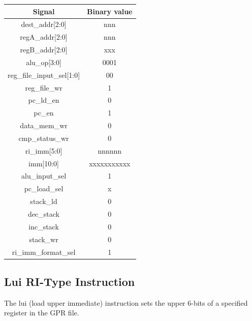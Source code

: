 \documentclass{article}
\begin{document}
\begin{par}
	\begin{center}
		\begin{tabular}{|c|c|}
			\hline 
			\textbf{Signal} & \textbf{Binary value} \\ 
			\hline 
			dest\_addr[2:0] & nnn \\ 
			\hline 
			regA\_addr[2:0] & nnn \\ 
			\hline 
			regB\_addr[2:0] & xxx \\ 
			\hline 
			alu\_op[3:0] & 0001 \\ 
			\hline 
			reg\_file\_input\_sel[1:0] & 00 \\ 
			\hline 
			reg\_file\_wr & 1 \\ 
			\hline 
			pc\_ld\_en & 0 \\ 
			\hline 
			pc\_en & 1 \\ 
			\hline 
			data\_mem\_wr & 0 \\ 
			\hline 
			cmp\_status\_wr & 0 \\ 
			\hline 
			ri\_imm[5:0] & nnnnnn \\ 
			\hline 
			imm[10:0] & xxxxxxxxxxx \\ 
			\hline 
			alu\_input\_sel & 1 \\ 
			\hline 
			pc\_load\_sel & x \\ 
			\hline 
			stack\_ld & 0 \\ 
			\hline 
			dec\_stack & 0 \\ 
			\hline 
			inc\_stack & 0 \\ 
			\hline 
			stack\_wr & 0 \\ 
			\hline 
			ri\_imm\_format\_sel & 1 \\ 
			\hline 
		\end{tabular} 
	\end{center}

	\newpage
	\subsection{Lui RI-Type Instruction}
	
	The lui (load upper immediate) instruction sets the upper 6-bits of a specified register in the GPR file. 
	

\end{par}
\end{document}
